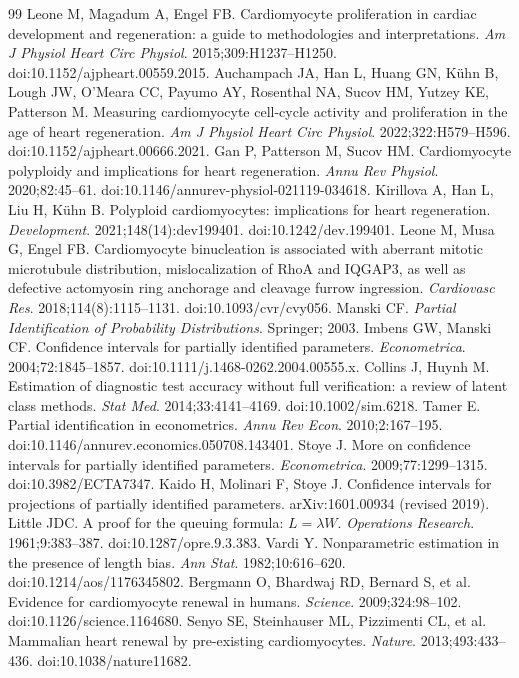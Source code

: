 \documentclass[11pt]{article}
\begin{document}
\begin{thebibliography}{99}
 Leone M, Magadum A, Engel FB. Cardiomyocyte proliferation in cardiac development and regeneration: a guide to methodologies and interpretations. \textit{Am J Physiol Heart Circ Physiol}. 2015;309:H1237--H1250. doi:10.1152/ajpheart.00559.2015.
 Auchampach JA, Han L, Huang GN, K\"uhn B, Lough JW, O'Meara CC, Payumo AY, Rosenthal NA, Sucov HM, Yutzey KE, Patterson M. Measuring cardiomyocyte cell-cycle activity and proliferation in the age of heart regeneration. \textit{Am J Physiol Heart Circ Physiol}. 2022;322:H579--H596. doi:10.1152/ajpheart.00666.2021.
 Gan P, Patterson M, Sucov HM. Cardiomyocyte polyploidy and implications for heart regeneration. \textit{Annu Rev Physiol}. 2020;82:45--61. doi:10.1146/annurev-physiol-021119-034618.
 Kirillova A, Han L, Liu H, K\"uhn B. Polyploid cardiomyocytes: implications for heart regeneration. \textit{Development}. 2021;148(14):dev199401. doi:10.1242/dev.199401.
 Leone M, Musa G, Engel FB. Cardiomyocyte binucleation is associated with aberrant mitotic microtubule distribution, mislocalization of RhoA and IQGAP3, as well as defective actomyosin ring anchorage and cleavage furrow ingression. \textit{Cardiovasc Res}. 2018;114(8):1115--1131. doi:10.1093/cvr/cvy056.
 Manski CF. \textit{Partial Identification of Probability Distributions}. Springer; 2003.
 Imbens GW, Manski CF. Confidence intervals for partially identified parameters. \textit{Econometrica}. 2004;72:1845--1857. doi:10.1111/j.1468-0262.2004.00555.x.
 Collins J, Huynh M. Estimation of diagnostic test accuracy without full verification: a review of latent class methods. \textit{Stat Med}. 2014;33:4141--4169. doi:10.1002/sim.6218.
 Tamer E. Partial identification in econometrics. \textit{Annu Rev Econ}. 2010;2:167--195. doi:10.1146/annurev.economics.050708.143401.
 Stoye J. More on confidence intervals for partially identified parameters. \textit{Econometrica}. 2009;77:1299--1315. doi:10.3982/ECTA7347.
 Kaido H, Molinari F, Stoye J. Confidence intervals for projections of partially identified parameters. arXiv:1601.00934 (revised 2019).
 Little JDC. A proof for the queuing formula: $L=\lambda W$. \textit{Operations Research}. 1961;9:383--387. doi:10.1287/opre.9.3.383.
 Vardi Y. Nonparametric estimation in the presence of length bias. \textit{Ann Stat}. 1982;10:616--620. doi:10.1214/aos/1176345802.
 Bergmann O, Bhardwaj RD, Bernard S, et al. Evidence for cardiomyocyte renewal in humans. \textit{Science}. 2009;324:98--102. doi:10.1126/science.1164680.
 Senyo SE, Steinhauser ML, Pizzimenti CL, et al. Mammalian heart renewal by pre-existing cardiomyocytes. \textit{Nature}. 2013;493:433--436. doi:10.1038/nature11682.
\end{thebibliography}
\end{document}
